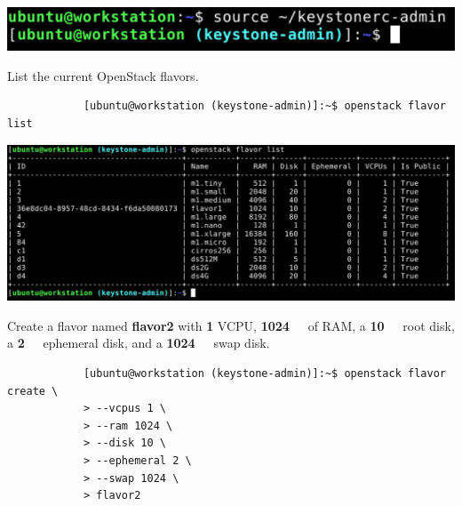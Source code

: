 \documentclass[letterpaper, 12pt]{article}
\begin{document}
\begin{enumerate}
\begin{labstep}
        \begin{center}
            \includegraphics[width=\linewidth]{images/part2/step6.png}
        \end{center}
    \end{labstep}

    \begin{labstep}
        List the current OpenStack flavors.
        \begin{lstlisting}
            [ubuntu@workstation (keystone-admin)]:~$ openstack flavor list
        \end{lstlisting}

        \begin{center}
            \includegraphics[width=\linewidth]{images/part2/step7.png}
        \end{center}
    \end{labstep}

    \begin{labstep}
        Create a flavor named \textbf{flavor2} with \textbf{1} VCPU, \textbf{\qty{1024}{\mega\byte}} of RAM, a \textbf{\qty{10}{\giga\byte}} root disk, a \textbf{\qty{2}{\giga\byte}} ephemeral disk, and a \textbf{\qty{1024}{\mega\byte}} swap disk.
        \begin{lstlisting}
            [ubuntu@workstation (keystone-admin)]:~$ openstack flavor create \
            > --vcpus 1 \
            > --ram 1024 \
            > --disk 10 \
            > --ephemeral 2 \
            > --swap 1024 \
            > flavor2
        \end{lstlisting}


\end{labstep}
\end{enumerate}
\end{document}
